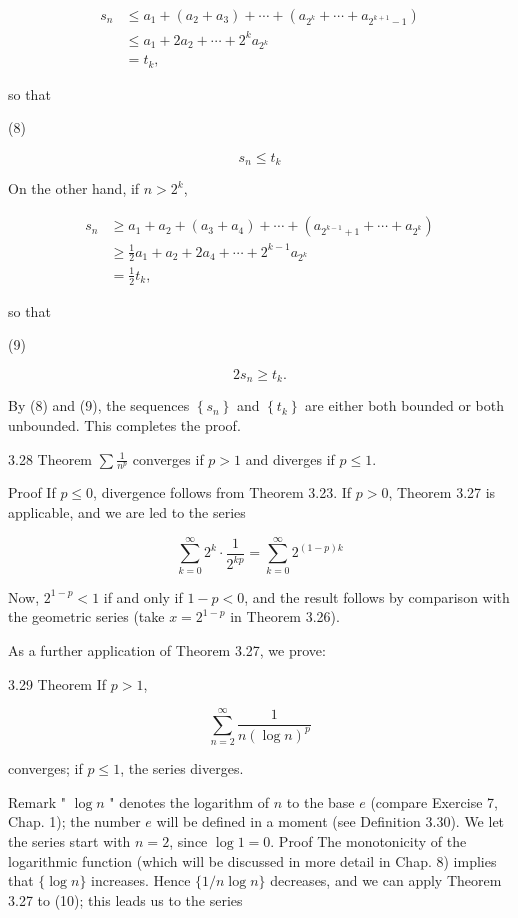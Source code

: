 \documentclass[10pt]{article}
\begin{document}
$$
\begin{aligned}
s_{n} & \leq a_{1}+\left(a_{2}+a_{3}\right)+\cdots+\left(a_{2^{k}}+\cdots+a_{2^{k+1}-1}\right) \\
& \leq a_{1}+2 a_{2}+\cdots+2^{k} a_{2^{k}} \\
& =t_{k},
\end{aligned}
$$

so that

(8)

$$
s_{n} \leq t_{k}
$$

On the other hand, if $n>2^{k}$,

$$
\begin{aligned}
s_{n} & \geq a_{1}+a_{2}+\left(a_{3}+a_{4}\right)+\cdots+\left(a_{2^{k-1}+1}+\cdots+a_{2^{k}}\right) \\
& \geq \frac{1}{2} a_{1}+a_{2}+2 a_{4}+\cdots+2^{k-1} a_{2^{k}} \\
& =\frac{1}{2} t_{k},
\end{aligned}
$$

so that

(9)

$$
2 s_{n} \geq t_{k} .
$$

By (8) and (9), the sequences $\left\{s_{n}\right\}$ and $\left\{t_{k}\right\}$ are either both bounded or both unbounded. This completes the proof.

3.28 Theorem $\sum \frac{1}{n^{p}}$ converges if $p>1$ and diverges if $p \leq 1$.

Proof If $p \leq 0$, divergence follows from Theorem 3.23. If $p>0$, Theorem 3.27 is applicable, and we are led to the series

$$
\sum_{k=0}^{\infty} 2^{k} \cdot \frac{1}{2^{k p}}=\sum_{k=0}^{\infty} 2^{(1-p) k}
$$

Now, $2^{1-p}<1$ if and only if $1-p<0$, and the result follows by comparison with the geometric series (take $x=2^{1-p}$ in Theorem 3.26).

As a further application of Theorem 3.27, we prove:

3.29 Theorem If $p>1$,

$$
\sum_{n=2}^{\infty} \frac{1}{n(\log n)^{p}}
$$

converges; if $p \leq 1$, the series diverges.

Remark " $\log n$ " denotes the logarithm of $n$ to the base $e$ (compare Exercise 7, Chap. 1); the number $e$ will be defined in a moment (see Definition 3.30). We let the series start with $n=2$, since $\log 1=0$. Proof The monotonicity of the logarithmic function (which will be discussed in more detail in Chap. 8) implies that $\{\log n\}$ increases. Hence $\{1 / n \log n\}$ decreases, and we can apply Theorem 3.27 to (10); this leads us to the series
\end{document}
